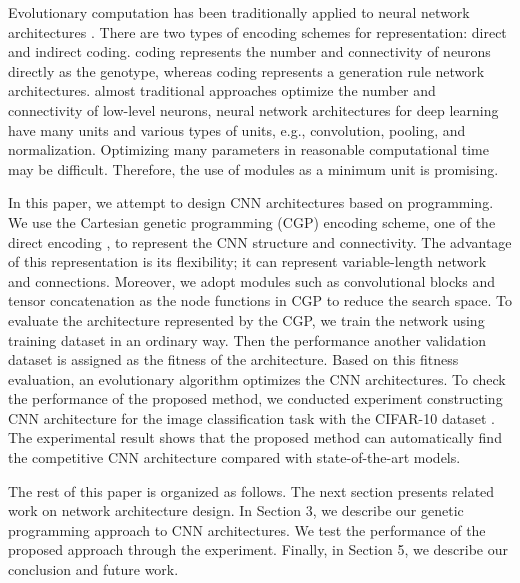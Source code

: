 Evolutionary computation has been traditionally applied to  neural network architectures \cite{schaffer_combinations_1992,stanley_evolving_2002}.
There are two types of encoding schemes for  representation: direct and indirect coding.
 coding represents the number and connectivity of neurons directly as the genotype, whereas  coding represents a generation rule  network architectures.
 almost  traditional approaches optimize the number and connectivity of low-level neurons,  neural network architectures for deep learning have many units and various types of units, e.g., convolution, pooling, and normalization.
Optimizing  many parameters in  reasonable  computational time may be difficult.
Therefore, the use of  modules as a minimum unit is promising.

In this paper, we attempt to design CNN architectures based on  programming.
We use the Cartesian genetic programming (CGP) \cite{miller_cartesian_2000,harding_evolution_2008,miller_redundancy_2006} encoding scheme, one of the direct encoding , to represent the CNN structure and connectivity.
The advantage of this representation is its flexibility; it can represent variable-length network  and  connections.
Moreover, we adopt   modules\new{,} such as convolutional blocks and tensor concatenation\new{,} as the node functions in CGP to reduce the search space.
To evaluate the architecture represented by the CGP, we train the network using  training dataset in an ordinary way. Then\new{,} the performance  another validation dataset is assigned as the fitness of the architecture. Based on this fitness evaluation, an evolutionary algorithm optimizes the CNN architectures.
To check the performance of the proposed method, we conducted  experiment  constructing  CNN architecture for the image classification task with the CIFAR-10 dataset \cite{krizhevsky_learning_2009}. The experimental result shows that the proposed method can  automatically find the competitive CNN architecture compared with state-of-the-art models.

The rest of this paper is organized as follows. The next section presents related work on  network architecture design. In Section 3, we describe our genetic programming approach to  CNN architectures. We test the performance of the proposed approach through the experiment. Finally, in Section 5, we describe our conclusion and future work.


